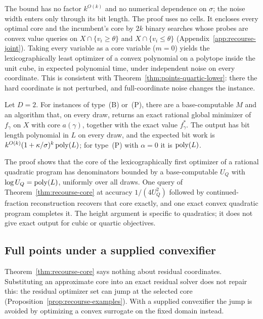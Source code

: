 The bound has no factor $k^{O(k)}$ and no numerical dependence on
$\sigma$; the noise width enters only through its bit length. The
proof uses no cells. It encloses every optimal core and the incumbent's
core by $2k$ binary searches whose probes are convex value queries on
$X\cap\{v_i\ge\theta\}$ and $X\cap\{v_i\le\theta\}$
(Appendix~\ref{app:recourse-joint}). Taking every variable as a core
variable ($m=0$) yields the lexicographically least optimizer of a
convex polynomial on a polytope inside the unit cube, in expected
polynomial time, under independent noise on every coordinate. This is
consistent with Theorem~\ref{thm:points-quartic-lower}: there the hard
coordinate is not perturbed, and full-coordinate noise changes the
instance.

\begin{corollary}
\label{cor:recourse-qp}
Let $D=2$. For instances of type~(B) or~(P), there are a
base-computable $M$ and an algorithm that, on every draw, returns an
exact rational global minimizer of $f_\gamma$ on $X$ with core
$a(\gamma)$, together with the exact value $f_\gamma^*$. The output has
bit length polynomial in $L$ on every draw, and the expected bit work
is $k^{O(k)}(1+\kappa/\sigma)^k\operatorname{poly}(L)$; for type~(P) with $\alpha=0$
it is $\operatorname{poly}(L)$.
\end{corollary}

The proof shows that the core of the lexicographically first optimizer
of a rational quadratic program has denominators bounded by a
base-computable $U_Q$ with $\log U_Q=\operatorname{poly}(L)$, uniformly over all draws.
One query of Theorem~\ref{thm:recourse-core} at accuracy
$1/(4U_Q^2)$ followed by continued-fraction reconstruction recovers that
core exactly, and one exact convex quadratic program
\citep{KozlovTarasovKhachiyan1980} completes it. The height argument is
specific to quadratics; it does not give exact output for cubic or
quartic objectives.

\subsection{Full points under a supplied convexifier}
\label{sec:recourse-convexified}

Theorem~\ref{thm:recourse-core} says nothing about residual coordinates.
Substituting an approximate core into an exact residual solver does not
repair this: the residual optimizer set can jump at the selected core
(Proposition~\ref{prop:recourse-examples}). With a supplied convexifier
the jump is avoided by optimizing a convex surrogate on the fixed
domain instead.

